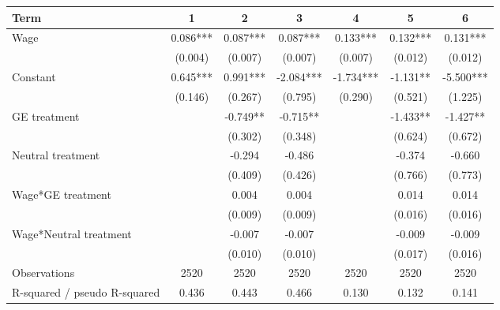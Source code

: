 \begin{tabular}{lcccccc}
\hline
Term & 1 & 2 & 3 & 4 & 5 & 6 \\
\hline
Wage & 0.086*** & 0.087*** & 0.087*** & 0.133*** & 0.132*** & 0.131*** \\
 & (0.004) & (0.007) & (0.007) & (0.007) & (0.012) & (0.012) \\
Constant & 0.645*** & 0.991*** & -2.084*** & -1.734*** & -1.131** & -5.500*** \\
 & (0.146) & (0.267) & (0.795) & (0.290) & (0.521) & (1.225) \\
GE treatment &  & -0.749** & -0.715** &  & -1.433** & -1.427** \\
 &  & (0.302) & (0.348) &  & (0.624) & (0.672) \\
Neutral treatment &  & -0.294 & -0.486 &  & -0.374 & -0.660 \\
 &  & (0.409) & (0.426) &  & (0.766) & (0.773) \\
Wage*GE treatment &  & 0.004 & 0.004 &  & 0.014 & 0.014 \\
 &  & (0.009) & (0.009) &  & (0.016) & (0.016) \\
Wage*Neutral treatment &  & -0.007 & -0.007 &  & -0.009 & -0.009 \\
 &  & (0.010) & (0.010) &  & (0.017) & (0.016) \\
Observations & 2520 & 2520 & 2520 & 2520 & 2520 & 2520 \\
R-squared / pseudo R-squared & 0.436 & 0.443 & 0.466 & 0.130 & 0.132 & 0.141 \\
\hline
\end{tabular}
